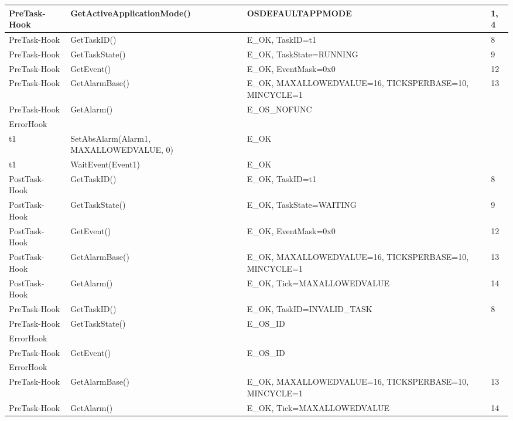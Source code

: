 \documentclass[10pt]{article}
\newlength{\Li}\settowidth{\Li}{Running}
\newlength{\Lii}\setlength{\Lii}{7cm}
\newlength{\Liiii}\setlength{\Liiii}{0.9cm}
\newlength{\Liii}\setlength{\Liii}{\textwidth} \addtolength{\Liii}{-\Li} \addtolength{\Liii}{-\Lii} \addtolength{\Liii}{-\Liiii}
\begin{document}
	\begin{supertabular}{|p{\Li}|p{\Lii}|p{\Liii}|p{\Liiii}|} \hline 
	PreTask-Hook		& GetActiveApplicationMode()			& OSDEFAULTAPPMODE			& 1, 4 \\ \hline
	PreTask-Hook		& GetTaskID()						& E\_OK, TaskID=t1				& 8 \\ \hline	
	PreTask-Hook		& GetTaskState()					& E\_OK, TaskState=RUNNING		& 9 \\ \hline	
	PreTask-Hook		& GetEvent()						& E\_OK, EventMask=0x0				& 12 \\ \hline	
	PreTask-Hook		& GetAlarmBase()					& E\_OK, MAXALLOWEDVALUE=16, TICKSPERBASE=10, MINCYCLE=1							& 13 \\ \hline
	PreTask-Hook		& GetAlarm()						& E\_OS\_NOFUNC					& \\ \hline	
	ErrorHook			& 								& 								& \\ \hline
	
	t1			& SetAbsAlarm(Alarm1, MAXALLOWEDVALUE, 0)	& E\_OK					& \\ \hline	
	t1			& WaitEvent(Event1)						& E\_OK							& \\ \hline
	
	PostTask-Hook		& GetTaskID()						& E\_OK, TaskID=t1				& 8 \\ \hline	
	PostTask-Hook		& GetTaskState()					& E\_OK, TaskState=WAITING			& 9 \\ \hline	
	PostTask-Hook		& GetEvent()						& E\_OK, EventMask=0x0				& 12 \\ \hline	
	PostTask-Hook		& GetAlarmBase()					& E\_OK, MAXALLOWEDVALUE=16, TICKSPERBASE=10, MINCYCLE=1							& 13 \\ \hline
	PostTask-Hook		& GetAlarm()						& E\_OK, Tick=MAXALLOWEDVALUE	& 14 \\ \hline	
	
	PreTask-Hook		& GetTaskID()						& E\_OK, TaskID=INVALID\_TASK		& 8 \\ \hline	
	PreTask-Hook		& GetTaskState()					& E\_OS\_ID						& \\ \hline	
	ErrorHook			& 								& 								& \\ \hline
	PreTask-Hook		& GetEvent()						& E\_OS\_ID						& \\ \hline	
	ErrorHook			& 								& 								& \\ \hline
	PreTask-Hook		& GetAlarmBase()					& E\_OK, MAXALLOWEDVALUE=16, TICKSPERBASE=10, MINCYCLE=1							& 13 \\ \hline
	PreTask-Hook		& GetAlarm()						& E\_OK, Tick=MAXALLOWEDVALUE	& 14 \\ \hline	
	

\end{supertabular}
\end{document}
